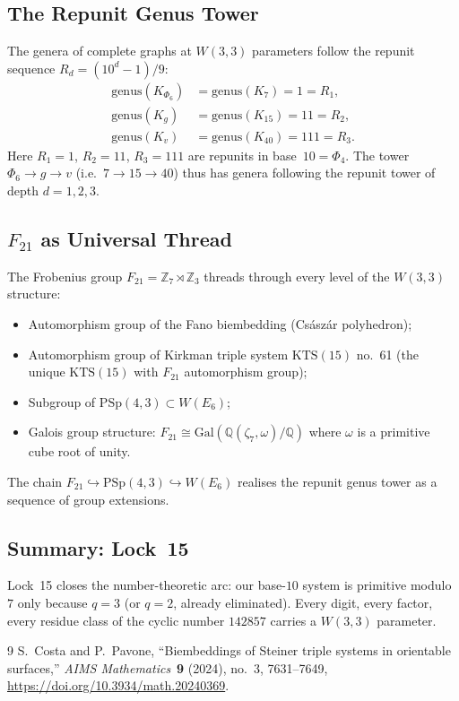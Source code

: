 \subsection{The Repunit Genus Tower}

The genera of complete graphs at $W(3,3)$ parameters follow the repunit sequence
$R_d = (10^d - 1)/9$:
\[
  \begin{aligned}
  \mathrm{genus}(K_{\Phi_6}) &= \mathrm{genus}(K_7) = 1 = R_1,\\
  \mathrm{genus}(K_g) &= \mathrm{genus}(K_{15}) = 11 = R_2,\\
  \mathrm{genus}(K_v) &= \mathrm{genus}(K_{40}) = 111 = R_3.
  \end{aligned}
\]
Here $R_1 = 1$, $R_2 = 11$, $R_3 = 111$ are repunits in base~$10 = \Phi_4$.
The tower $\Phi_6 \to g \to v$ (i.e.\ $7 \to 15 \to 40$) thus has genera
following the repunit tower of depth $d = 1, 2, 3$.

\subsection{$F_{21}$ as Universal Thread}

The Frobenius group $F_{21} = \mathbb{Z}_7 \rtimes \mathbb{Z}_3$ threads through every level
of the $W(3,3)$ structure:
\begin{itemize}
  \item Automorphism group of the Fano biembedding (Cs\'asz\'ar polyhedron);
  \item Automorphism group of Kirkman triple system $\mathrm{KTS}(15)$ no.~61
        (the unique $\mathrm{KTS}(15)$ with $F_{21}$ automorphism group);
  \item Subgroup of $\mathrm{PSp}(4,3) \subset W(E_6)$;
  \item Galois group structure: $F_{21} \cong \mathrm{Gal}(\mathbb{Q}(\zeta_7,\omega)/\mathbb{Q})$
        where $\omega$ is a primitive cube root of unity.
\end{itemize}
The chain $F_{21} \hookrightarrow \mathrm{PSp}(4,3) \hookrightarrow W(E_6)$
realises the repunit genus tower as a sequence of group extensions.

\subsection{Summary: Lock~15}

Lock~15 closes the number-theoretic arc: our base-$10$ system is primitive
modulo~$7$ only because $q = 3$ (or $q = 2$, already eliminated).  Every
digit, every factor, every residue class of the cyclic number $142857$ carries
a $W(3,3)$ parameter.

\begin{thebibliography}{9}
  S.~Costa and P.~Pavone,
  ``Biembeddings of Steiner triple systems in orientable surfaces,''
  \textit{AIMS Mathematics}\ \textbf{9} (2024), no.~3, 7631--7649,
  \url{https://doi.org/10.3934/math.20240369}.
\end{thebibliography}
